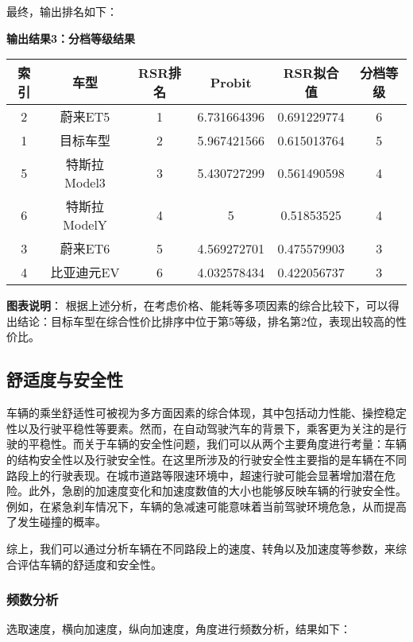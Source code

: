 \documentclass[withoutpreface,bwprint]{cumcmthesis} %
\begin{document}
最终，输出排名如下：


\textbf{输出结果3：分档等级结果}
\begin{table}[htbp]
\centering
\begin{tabular}{cccccc}
\hline
索引 & 车型        & RSR排名 & Probit      & RSR拟合值      & 分档等级 \\ \hline
2  & 蔚来ET5     & 1     & 6.731664396 & 0.691229774 & 6    \\
1  & 目标车型      & 2     & 5.967421566 & 0.615013764 & 5    \\
5  & 特斯拉Model3 & 3     & 5.430727299 & 0.561490598 & 4    \\
6  & 特斯拉ModelY & 4     & 5           & 0.51853525  & 4    \\
3  & 蔚来ET6     & 5     & 4.569272701 & 0.475579903 & 3    \\
4  & 比亚迪元EV    & 6     & 4.032578434 & 0.422056737 & 3    \\ \hline
\end{tabular}
\end{table}

\textbf{图表说明}：
根据上述分析，在考虑价格、能耗等多项因素的综合比较下，可以得出结论：目标车型在综合性价比排序中位于第5等级，排名第2位，表现出较高的性价比。 

\subsection{舒适度与安全性}

车辆的乘坐舒适性可被视为多方面因素的综合体现，其中包括动力性能、操控稳定性以及行驶平稳性等要素。然而，在自动驾驶汽车的背景下，乘客更为关注的是行驶的平稳性。而关于车辆的安全性问题，我们可以从两个主要角度进行考量：车辆的结构安全性以及行驶安全性。在这里所涉及的行驶安全性主要指的是车辆在不同路段上的行驶表现。在城市道路等限速环境中，超速行驶可能会显著增加潜在危险。此外，急剧的加速度变化和加速度数值的大小也能够反映车辆的行驶安全性。例如，在紧急刹车情况下，车辆的急减速可能意味着当前驾驶环境危急，从而提高了发生碰撞的概率。

综上，我们可以通过分析车辆在不同路段上的速度、转角以及加速度等参数，来综合评估车辆的舒适度和安全性。


\subsubsection{频数分析}

选取速度，横向加速度，纵向加速度，角度进行频数分析，结果如下：
\end{document}
